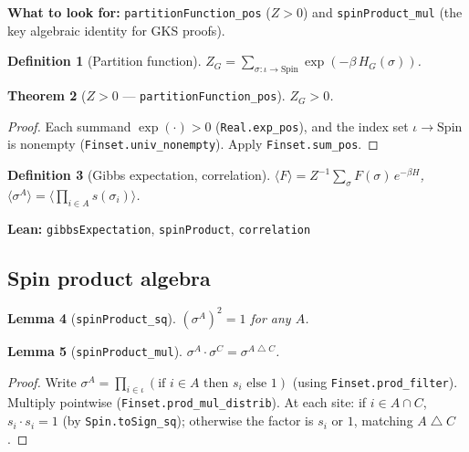 \documentclass[a4paper,11pt]{article}
\newtheorem{theorem}{Theorem}
\newtheorem{lemma}[theorem]{Lemma}
\newtheorem{definition}[theorem]{Definition}
\begin{document}
\textbf{What to look for:} \texttt{partitionFunction\_pos} ($Z > 0$)
and \texttt{spinProduct\_mul} (the key algebraic identity for GKS proofs).

\begin{definition}[Partition function]
$Z_G = \sum_{\sigma : \iota \to \mathrm{Spin}} \exp(-\beta\, H_G(\sigma))$.
\end{definition}

\begin{theorem}[$Z > 0$ --- \texttt{partitionFunction\_pos}]
$Z_G > 0$.
\end{theorem}

\begin{proof}
Each summand $\exp(\cdot) > 0$ (\texttt{Real.exp\_pos}), and the
index set $\iota \to \mathrm{Spin}$ is nonempty
(\texttt{Finset.univ\_nonempty}).
Apply \texttt{Finset.sum\_pos}.
\end{proof}

\begin{definition}[Gibbs expectation, correlation]
$\langle F \rangle = Z^{-1} \sum_\sigma F(\sigma)\,e^{-\beta H}$, \quad
$\langle \sigma^A \rangle = \langle \prod_{i \in A} s(\sigma_i) \rangle$.
\end{definition}

\noindent\textbf{Lean:} \texttt{gibbsExpectation},
\texttt{spinProduct}, \texttt{correlation}

\subsection{Spin product algebra}

\begin{lemma}[\texttt{spinProduct\_sq}]
$(\sigma^A)^2 = 1$ for any $A$.
\end{lemma}

\begin{lemma}[\texttt{spinProduct\_mul}]
$\sigma^A \cdot \sigma^C = \sigma^{A \bigtriangleup C}$.
\end{lemma}

\begin{proof}
Write $\sigma^A = \prod_{i \in \iota}
(\text{if } i \in A \text{ then } s_i \text{ else } 1)$
(using \texttt{Finset.prod\_filter}).
Multiply pointwise (\texttt{Finset.prod\_mul\_distrib}).
At each site: if $i \in A \cap C$, $s_i \cdot s_i = 1$ (by
\texttt{Spin.toSign\_sq}); otherwise the factor is $s_i$ or $1$,
matching $A \bigtriangleup C$.
\end{proof}
\end{document}
